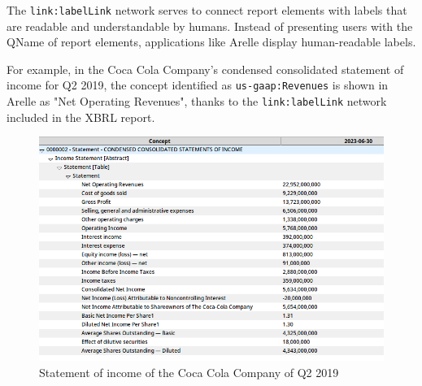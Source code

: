 The \texttt{link:labelLink} network serves to connect report elements with labels that are readable and understandable by humans.
Instead of presenting users with the QName of report elements, applications like Arelle display human-readable labels.

For example, in the Coca Cola Company's condensed consolidated statement of income for Q2 2019,
the concept identified as \texttt{us-gaap:Revenues} is shown in Arelle as "Net Operating Revenues",
thanks to the \texttt{link:labelLink} network included in the XBRL report.

\begin{figure}[H]
    \centering
    \includegraphics[width=\textwidth]{images/coca_cola_2019_q2.png}
    \caption{Statement of income of the Coca Cola Company of Q2 2019}
    \label{fig:coca_cola_2019_q2}
\end{figure}




